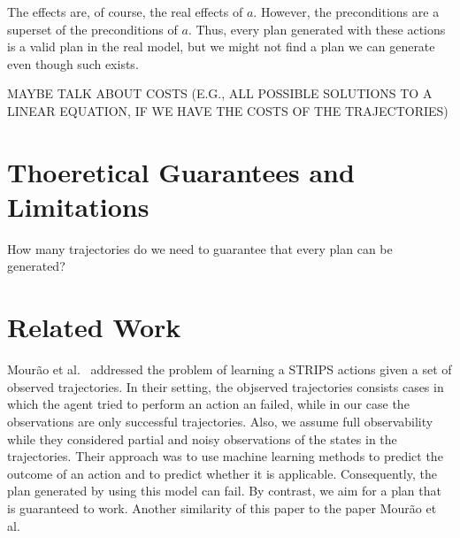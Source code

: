 \documentclass[letterpaper]{article}
\begin{document}
The effects are, of course, the real effects of $a$. However, the preconditions are a superset of the preconditions of $a$. Thus, every plan generated with these actions is a valid plan in the real model, but we might not find a plan we can generate even though such exists. 

MAYBE TALK ABOUT COSTS (E.G., ALL POSSIBLE SOLUTIONS TO A LINEAR EQUATION, IF WE HAVE THE COSTS OF THE TRAJECTORIES)




\section{Thoeretical Guarantees and Limitations}



How many trajectories do we need to guarantee that every plan can be generated?


\section{Related Work}
Mour{\~{a}}o et al.~ addressed the problem of learning a STRIPS actions given a set of observed trajectories. In their setting, the objserved trajectories consists cases in which the agent tried to perform an action an failed, while in our case the observations are only successful trajectories. Also, we assume full observability while they considered partial and noisy observations of the states in the trajectories. Their approach was to use machine learning methods to predict the outcome of an action and to predict whether it is applicable. Consequently, the plan generated by using this model can fail. By contrast, we aim for a plan that is guaranteed to work. Another similarity of this paper to the paper Mour{\~{a}}o et al.~ 
\end{document}
